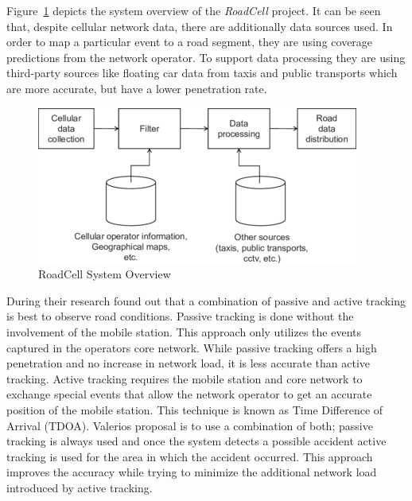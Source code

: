 \documentclass[master,english]{hgbthesis}
\begin{document}
Figure~\ref{fig:roadcell} depicts the system overview of the \emph{RoadCell} project. It can be seen that, despite cellular network data, there are additionally data sources used. In order to map a particular event to a road segment, they are using coverage predictions from the network operator. To support data processing they are using third-party sources like floating car data from taxis and public transports which are more accurate, but have a lower penetration rate.

\begin{figure}

\centering

\includegraphics[width=0.7\linewidth]{./images/roadcell.png}

\caption{RoadCell System Overview \cite{Valerio2009}}

\label{fig:roadcell}

\end{figure}

During their research found out that a combination of passive and active tracking is best to observe road conditions. Passive tracking is done without the involvement of the mobile station. This approach only utilizes the events captured in the operators core network. While passive tracking offers a high penetration and no increase in network load, it is less accurate than active tracking. Active tracking requires the mobile station and core network to exchange special events that allow the network operator to get an accurate position of the mobile station. This technique is known as Time Difference of Arrival (TDOA). Valerios proposal is to use a combination of both; passive tracking is always used and once the system detects a possible accident active tracking is used for the area in which the accident occurred. This approach improves the accuracy while trying to minimize the additional network load introduced by active tracking.


\end{document}
